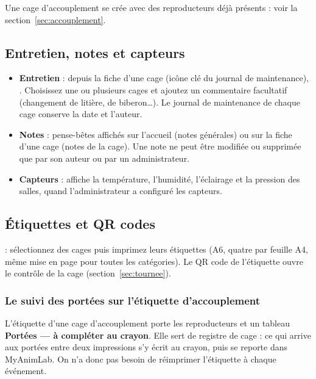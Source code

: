\documentclass[11pt,a4paper]{article}
\begin{document}
Une cage d'accouplement se crée avec des reproducteurs déjà présents :
voir la section~\ref{sec:accouplement}.

\subsection{Entretien, notes et capteurs}
\begin{itemize}
  \item \textbf{Entretien} : depuis la fiche d'une cage (icône clé du journal
    de maintenance), . Choisissez une ou
    plusieurs cages et ajoutez un commentaire facultatif (changement de
    litière, de biberon\ldots). Le journal de maintenance de chaque cage
    conserve la date et l'auteur.
  \item \textbf{Notes} : pense-bêtes affichés sur l'accueil (notes générales)
    ou sur la fiche d'une cage (notes de la cage). Une note ne peut être
    modifiée ou supprimée que par son auteur ou par un administrateur.
  \item \textbf{Capteurs} :  affiche la
    température, l'humidité, l'éclairage et la pression des salles, quand
    l'administrateur a configuré les capteurs.
\end{itemize}

\subsection{Étiquettes et QR codes}\label{sec:etiquettes}
 : sélectionnez des cages puis imprimez leurs
étiquettes (A6, quatre par feuille A4, même mise en page pour toutes les
catégories). Le QR code de l'étiquette ouvre le contrôle de la cage
(section~\ref{sec:tournee}).

\subsubsection*{Le suivi des portées sur l'étiquette d'accouplement}
L'étiquette d'une cage d'accouplement porte les reproducteurs et un tableau
\textbf{Portées --- à compléter au crayon}. Elle sert de registre de cage :
ce qui arrive aux portées entre deux impressions s'y écrit au crayon, puis
se reporte dans MyAnimLab. On n'a donc pas besoin de réimprimer l'étiquette
à chaque événement.
\end{document}
